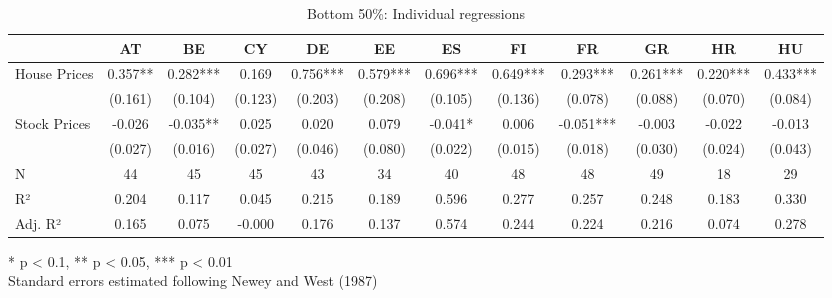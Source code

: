\documentclass[
  a4paper,
  DIV=11,
  numbers=noendperiod]{scrartcl}
\begin{document}
\begin{landscape}

\begin{table}[h]
\caption{Bottom 50\%: Individual regressions} 
\fontsize{7.5pt}{9.0pt}\selectfont
\begin{tabular*}{\linewidth}{@{\extracolsep{\fill}}lccccccccccc}
\toprule
  & AT & BE & CY & DE & EE & ES & FI & FR & GR & HR & HU \\ 
\midrule\addlinespace[2.5pt]
House Prices & 0.357** & 0.282*** & 0.169 & 0.756*** & 0.579*** & 0.696*** & 0.649*** & 0.293*** & 0.261*** & 0.220*** & 0.433*** \\ 
 & (0.161) & (0.104) & (0.123) & (0.203) & (0.208) & (0.105) & (0.136) & (0.078) & (0.088) & (0.070) & (0.084) \\ 
Stock Prices & -0.026 & -0.035** & 0.025 & 0.020 & 0.079 & -0.041* & 0.006 & -0.051*** & -0.003 & -0.022 & -0.013 \\ 
{} & {(0.027)} & {(0.016)} & {(0.027)} & {(0.046)} & {(0.080)} & {(0.022)} & {(0.015)} & {(0.018)} & {(0.030)} & {(0.024)} & {(0.043)} \\ 
N & 44 & 45 & 45 & 43 & 34 & 40 & 48 & 48 & 49 & 18 & 29 \\ 
R² & 0.204 & 0.117 & 0.045 & 0.215 & 0.189 & 0.596 & 0.277 & 0.257 & 0.248 & 0.183 & 0.330 \\ 
Adj. R² & 0.165 & 0.075 & -0.000 & 0.176 & 0.137 & 0.574 & 0.244 & 0.224 & 0.216 & 0.074 & 0.278 \\ 
\bottomrule
\end{tabular*}
\begin{minipage}{\linewidth}
* p < 0.1, ** p < 0.05, *** p < 0.01\\
Standard errors estimated following Newey and West (1987)\\
\end{minipage}
\end{table}





\end{landscape}
\end{document}
